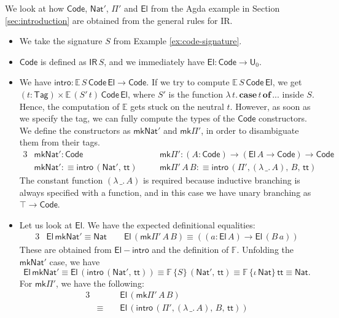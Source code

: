 \documentclass[acmsmall,screen,review]{acmart}
\newcommand{\msf}[1]{{\mathsf{#1}}}
\newcommand{\mbf}[1]{{\mathbf{#1}}}
\newcommand{\mbb}[1]{\mathbb{#1}}
\newcommand{\U}{\msf{U}}
\newcommand{\Nat}{\msf{Nat}}
\newcommand{\El}{\msf{El}}
\newcommand{\Code}{\msf{Code}}
\newcommand{\Tag}{\msf{Tag}}
\newcommand{\case}{\mbf{case}}
\newcommand{\of}{\mbf{of}}
\newcommand{\ttt}{\msf{tt}}
\newcommand{\IR}{\msf{IR}}
\newcommand{\intro}{\msf{intro}}
\newcommand{\E}{\mbb{E}}
\newcommand{\F}{\mbb{F}}
\begin{document}
\begin{example}\label{ex:code-constructors} We look at how $\Code$, $\Nat'$, $\Pi'$ and $\El$ from the Agda
example in Section \ref{sec:introduction} are obtained from the general rules for IR.
\begin{itemize}
\item We take the signature $S$ from Example \ref{ex:code-signature}.
\item $\Code$ is defined as $\IR\,S$, and we immediately have $\El : \Code \to \U_0$.
\item We have $\intro : \E\,S\,\Code\,\El \to \Code$. If we try to compute $\E\,S\,\Code\,\El$, we
  get $(t : \Tag) \times \E\,(S'\,t)\,\Code\,\El$, where $S'$ is the function
  $\lambda\,t.\,\case\,t\,\of\,...$ inside $S$. Hence, the computation of $\E$ gets stuck on the
  neutral $t$. However, as soon as we specify the tag, we can fully compute the types of the $\Code$
  constructors. We define the constructors as $\msf{mk}\Nat'$ and $\msf{mk}\Pi'$, in order to disambiguate them
  from their tags.
  \begin{alignat*}{3}
    & \msf{mk}\Nat' : \Code                         && \msf{mk}\Pi' : (A : \Code) \to (\El\,A \to \Code) \to \Code\\
    & \msf{mk}\Nat' :\equiv \intro\,(\Nat',\,\ttt)\quad  && \msf{mk}\Pi'\,A\,B :\equiv \intro\,(\Pi',(\lambda\,\_.\,A),\,B,\,\ttt)
  \end{alignat*}
  The constant function $(\lambda\,\_.\,A)$ is required because inductive branching is always
  specified with a function, and in this case we have unary branching as $\top \to \Code$.
\item Let us look at $\El$. We have the expected definitional equalities:
  \begin{alignat*}{3}
    & \El\,\msf{mk}\Nat' \equiv \Nat \hspace{2em} \El\,(\msf{mk}\Pi'\,A\,B) \equiv ((a : \El\,A) \to \El\,(B\,a))
  \end{alignat*}
  These are obtained from $\msf{El\!\!-\!\!intro}$ and the definition of $\F$. Unfolding the $\msf{mk}\Nat'$ case, we have
  \[ \El\,\msf{mk}\Nat' \equiv \El\,(\intro\,(\Nat',\,\ttt)) \equiv \F\,\{S\}\,(\Nat',\,\ttt) \equiv \F\,\{\iota\,\Nat\}\,\ttt \equiv \Nat. \]
  For $\msf{mk}\Pi'$, we have the following:
  \begin{alignat*}{3}
    &            &&\El\,(\msf{mk}\Pi'\,A\,B)\\
    & \equiv\,\, &&\El\,(\intro\,(\Pi',(\lambda\,\_.\,A),\,B,\,\ttt))\\

\end{alignat*}
\end{itemize}
\end{example}
\end{document}
